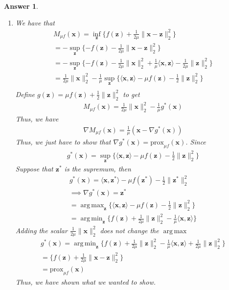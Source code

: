 \documentclass[12pt]{article}
\DeclareMathOperator*{\argmin}{arg\,min}
\DeclareMathOperator*{\argmax}{arg\,max}
\theoremstyle{colon}
\newtheorem*{answer}{Answer}
\begin{document}
\begin{answer}
\begin{enumerate}[label=\alph*)]
		\item We have that
			\begin{gather*}
				M_{\mu f} (\bm{x}) = \inf_{\bm{z}} \{ f(\bm{z}) + \frac{1}{2\mu} \lVert \bm{x} - \bm{z} \rVert_2^2 \} \\
				= - \sup_{\bm{z}} \{ -f(\bm{z}) - \frac{1}{2\mu} \lVert \bm{x} - \bm{z} \rVert_2^2 \} \\
				= - \sup_{\bm{z}} \{ -f(\bm{z}) - \frac{1}{2\mu} \lVert \bm{x} \rVert_2^2 + \frac{1}{\mu} \langle \bm{x}, \bm{z} \rangle - \frac{1}{2\mu} \lVert \bm{z}\rVert_2^2 \} \\
				= \frac{1}{2\mu} \lVert \bm{x} \rVert_2^2 - \frac{1}{\mu} \sup_{\bm{z}} \{ \langle \bm{x}, \bm{z} \rangle - \mu f(\bm{z}) - \frac{1}{2} \lVert \bm{z}\rVert_2^2 \} \\
			\end{gather*}
			Define $g(\bm{z}) = \mu f(\bm{z}) + \frac{1}{2} \lVert \bm{z}\rVert_2^2$ to get
			\begin{gather*}
				M_{\mu f} (\bm{x}) = \frac{1}{2\mu} \lVert \bm{x} \rVert_2^2 - \frac{1}{\mu} g^*(\bm{x})
			\end{gather*}
			Thus, we have
			\begin{gather*}
				\nabla M_{\mu f} (\bm{x}) = \frac{1}{\mu} (\bm{x} - \nabla g^*(\bm{x}))
			\end{gather*}
			Thus, we just have to show that $\nabla g^*(\bm{x}) = \text{prox}_{\mu f}(\bm{x})$. Since
			\begin{gather*}
				g^*(\bm{x}) = \sup_{\bm{z}} \{ \langle \bm{x}, \bm{z} \rangle - \mu f(\bm{z}) - \frac{1}{2} \lVert \bm{z}\rVert_2^2 \}
			\end{gather*}
			Suppose that $\bm{z}^*$ is the supremum, then 
			\begin{gather*}
				g^*(\bm{x}) = \langle \bm{x}, \bm{z}^* \rangle - \mu f(\bm{z}^*) - \frac{1}{2} \lVert \bm{z}^* \rVert_2^2 \\
				\implies \nabla g^*(\bm{x}) = \bm{z}^* \\
				= \argmax_{\bm{z}} \{ \langle \bm{x}, \bm{z} \rangle - \mu f(\bm{z}) - \frac{1}{2} \lVert \bm{z}\rVert_2^2 \} \\
				= \argmin_{\bm{z}} \{ f(\bm{z}) + \frac{1}{2\mu} \lVert \bm{z} \rVert_2^2 - \frac{1}{\mu} \langle \bm{x}, \bm{z} \rangle \}
			\end{gather*}
			Adding the scalar $\frac{1}{2\mu} \lVert \bm{x}\rVert_2^2$ does not change the $\argmax$
			\begin{gather*}
				g^*(\bm{x}) = \argmin_{\bm{z}} \{ f(\bm{z}) + \frac{1}{2\mu} \lVert \bm{z} \rVert_2^2 - \frac{1}{\mu} \langle \bm{x}, \bm{z} \rangle + \frac{1}{2\mu} \lVert \bm{z} \rVert_2^2 \} \\
				= \{ f(\bm{z}) + \frac{1}{2\mu} \lVert \bm{x} - \bm{z} \rVert_2^2 \} \\
				= \text{prox}_{\mu f}(\bm{x})
			\end{gather*}
			Thus, we have shown what we wanted to show.


\end{enumerate}
\end{answer}
\end{document}
